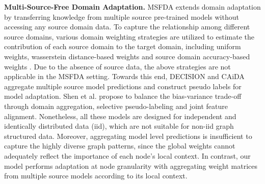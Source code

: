 \textbf{Multi-Source-Free Domain Adaptation.} MSFDA extends domain adaptation by transferring knowledge from multiple source pre-trained models without accessing any source domain data. To capture the relationship among different source domains, various domain weighting strategies are utilized to estimate the contribution of each source domain to the target domain, including uniform weights, wasserstein distance-based weights and source domain accuracy-based weights \cite{peng2019moment,zhao2020multi,wang2019tmda,zhu2019aligning}. Due to the absence of source data, the above strategies are not applicable in the MSFDA setting. Towards this end, DECISION \cite{ahmed2021unsupervised} and CAiDA \cite{dong2021confident} aggregate multiple source model predictions and construct pseudo labels for model adaptation. Shen et al. \cite{shen2023balancing} propose to balance the bias-variance trade-off through domain aggregation, selective pseudo-labeling and joint feature alignment. Nonetheless, all these models are designed for independent and identically distributed data (iid), which are not suitable for non-iid graph structured data. Moreover, aggregating model level predictions is insufficient to capture the highly diverse graph patterns, since the global weights cannot adequately reflect the importance of each node's local context. In contrast, our model performs adaptation at node granularity with aggregating weight matrices from multiple source models according to its local context.